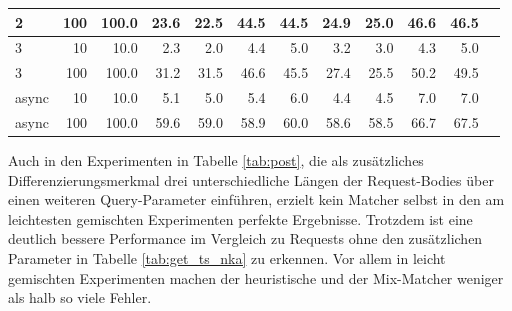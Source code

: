 \documentclass[12pt,a4paper]{report}
\begin{document}
\begin{table}[H]
\begin{tabular}{|l|r|r|r|r|r|r|r|r|r|r|r|}
		2                        & 100                            & 100.0                          & 23.6                          & 22.5                          & 44.5                            & 44.5 & 24.9 & 25.0 & 46.6 & 46.5 \\ \hline
		3                        & 10                             & 10.0                           & 2.3                           & 2.0                           & 4.4                             & 5.0  & 3.2  & 3.0  & 4.3  & 5.0  \\ \hline
		3                        & 100                            & 100.0                          & 31.2                          & 31.5                          & 46.6                            & 45.5 & 27.4 & 25.5 & 50.2 & 49.5 \\ \hline
		async                    & 10                             & 10.0                           & 5.1                           & 5.0                           & 5.4                             & 6.0  & 4.4  & 4.5  & 7.0  & 7.0  \\ \hline
		async                    & 100                            & 100.0                          & 59.6                          & 59.0                          & 58.9                            & 60.0 & 58.6 & 58.5 & 66.7 & 67.5 \\ \hline
	\end{tabular}
\end{table}

Auch in den Experimenten in Tabelle \ref{tab:post}, die als zusätzliches Differenzierungsmerkmal drei unterschiedliche Längen der
Request-Bodies über einen weiteren Query-Parameter einführen, erzielt kein Matcher selbst in den am leichtesten gemischten
Experimenten perfekte Ergebnisse. Trotzdem ist eine deutlich bessere Performance im Vergleich zu Requests ohne den zusätzlichen
Parameter in Tabelle \ref{tab:get_ts_nka} zu erkennen. Vor allem in leicht gemischten Experimenten machen der heuristische und der
Mix-Matcher weniger als halb so viele Fehler.
\end{document}
